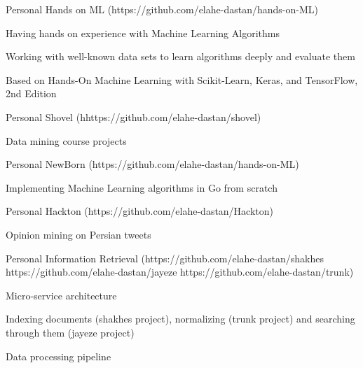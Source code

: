 \begin{cventries}
    \cventry
    {Personal} %
    {Hands on ML ({\tiny https://github.com/elahe-dastan/hands-on-ML})} %
    {} %
    {} %
    {
      \begin{cvitems} %
        \item{Having hands on experience with Machine Learning Algorithms}
        \item{Working with well-known data sets to learn algorithms deeply and evaluate them}
        \item{Based on Hands-On Machine Learning with Scikit-Learn, Keras, and TensorFlow, 2nd Edition }
      \end{cvitems}
    }

    \cventry
    {Personal} %
    {Shovel ({\tiny hhttps://github.com/elahe-dastan/shovel})} %
    {} %
    {} %
    {
      \begin{cvitems} %
        \item{Data mining course projects}
      \end{cvitems}
    }

    \cventry
    {Personal} %
    {NewBorn ({\tiny https://github.com/elahe-dastan/hands-on-ML})} %
    {} %
    {} %
    {
      \begin{cvitems} %
        \item{Implementing Machine Learning algorithms in Go from scratch}
      \end{cvitems}
    }

    \cventry
    {Personal} %
    {Hackton ({\tiny https://github.com/elahe-dastan/Hackton})} %
    {} %
    {} %
    {
      \begin{cvitems} %
        \item{Opinion mining on Persian tweets}
      \end{cvitems}
    }

    \cventry
    {Personal} %
    {Information Retrieval ({\tiny https://github.com/elahe-dastan/shakhes} {\tiny https://github.com/elahe-dastan/jayeze} {\tiny https://github.com/elahe-dastan/trunk})} %
    {} %
    {} %
    {
      \begin{cvitems} %
        \item{Micro-service architecture}
        \item{Indexing documents (shakhes project), normalizing (trunk project) and searching through them (jayeze project)}
        \item{Data processing pipeline}
      \end{cvitems}
    }
    

\end{cventries}
